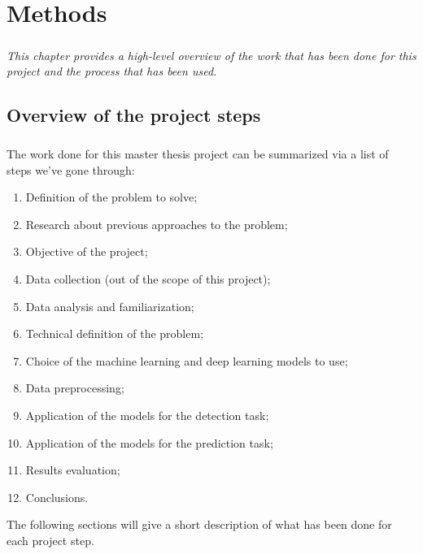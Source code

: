 
\chapter{Methods} \label{chap: methods}

\paragraph{} \textit{This chapter provides a high-level overview of the work that has been done for this project and the process that has been used.}


\section{Overview of the project steps} \label{sec: overview_project_steps}
\paragraph{} The work done for this master thesis project can be summarized via a list of steps we've gone through:
\begin{enumerate}
    \item Definition of the problem to solve;
    \item Research about previous approaches to the problem;
    \item Objective of the project;
    \item Data collection (out of the scope of this project);
    \item Data analysis and familiarization;
    \item Technical definition of the problem;
    \item Choice of the machine learning and deep learning models to use;
    \item Data preprocessing;
    \item Application of the models for the detection task;
    \item Application of the models for the prediction task;
    \item Results evaluation;
    \item Conclusions.
\end{enumerate}
The following sections will give a short description of what has been done for each project step.

